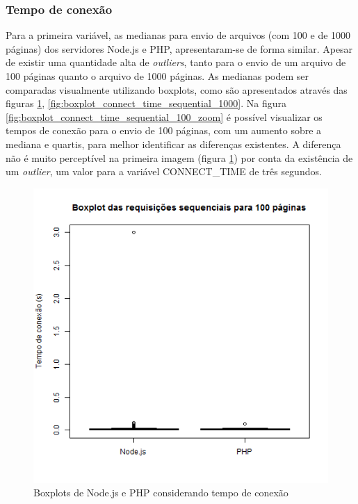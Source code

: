\documentclass[conference,compsoc]{IEEEtran}
\begin{document}
\subsubsection{Tempo de conexão}
Para a primeira variável, as medianas para envio de arquivos (com 100 e de 1000 páginas) dos servidores Node.js e PHP, apresentaram-se de forma similar. Apesar de existir uma quantidade alta de \textit{outliers}, tanto para o envio de um arquivo de 100 páginas quanto o arquivo de 1000 páginas. As medianas podem ser comparadas visualmente utilizando boxplots, como são apresentados através das figuras \ref{fig:boxplot_connect_time_sequential_100},  \ref{fig:boxplot_connect_time_sequential_1000}. Na figura \ref{fig:boxplot_connect_time_sequential_100_zoom} é possível visualizar os tempos de conexão para o envio de 100 páginas, com um aumento sobre a mediana e quartis, para melhor identificar as diferenças existentes. A diferença não é muito perceptível na primeira imagem (figura \ref{fig:boxplot_connect_time_sequential_100}) por conta da existência de um \textit{outlier}, um valor para a variável CONNECT\_TIME de três segundos.

\begin{figure}[h!]
\centering
  \includegraphics[scale=0.35]{plots/boxplots/sequential/CONNECT_TIME/boxplot_CONNECT_TIME_100_pages.png}
  	\caption{Boxplots de Node.js e PHP considerando tempo de conexão}
	\label{fig:boxplot_connect_time_sequential_100}
\end{figure}
\end{document}
